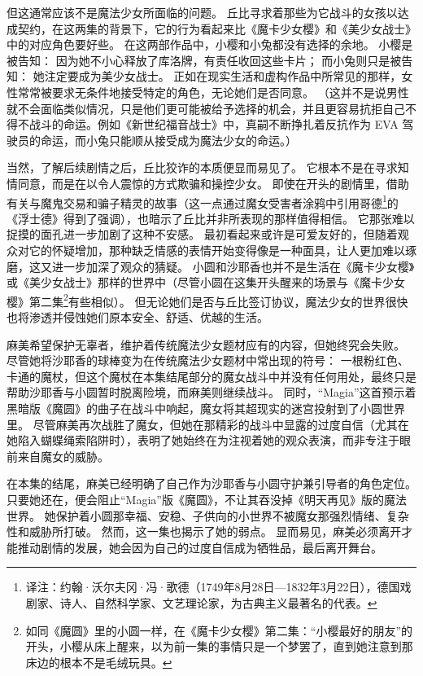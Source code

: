 但这通常应该不是魔法少女所面临的问题。
丘比寻求着那些为它战斗的女孩以达成契约，在这两集的背景下，它的行为看起来比《魔卡少女樱》和《美少女战士》中的对应角色要好些。
在这两部作品中，小樱和小兔都没有选择的余地。
小樱是被告知：
因为她不小心释放了库洛牌，有责任收回这些卡片\cite{ref11}；
而小兔则只是被告知：
她注定要成为美少女战士。
正如在现实生活和虚构作品中所常见的那样，女性常常被要求无条件地接受特定的角色，无论她们是否同意\cite{ref22}。
（这并不是说男性就不会面临类似情况，只是他们更可能被给予选择的机会，并且更容易抗拒自己不得不战斗的命运。例如《新世纪福音战士》中，真嗣不断挣扎着反抗作为 EVA 驾驶员的命运，而小兔只能顺从接受成为魔法少女的命运。）

当然，了解后续剧情之后，丘比狡诈的本质便显而易见了。
它根本不是在寻求知情同意，而是在以令人震惊的方式欺骗和操控少女。
即使在开头的剧情里，借助有关与魔鬼交易和骗子精灵的故事（这一点通过魔女受害者涂鸦中引用哥德\footnote{%
    译注：约翰·沃尔夫冈·冯·歌德（1749年8月28日—1832年3月22日），德国戏剧家、诗人、自然科学家、文艺理论家，为古典主义最著名的代表。
}的《浮士德》得到了强调），也暗示了丘比并非所表现的那样值得相信。
它那张难以捉摸的面孔进一步加剧了这种不安感。
最初看起来或许是可爱友好的，但随着观众对它的怀疑增加，那种缺乏情感的表情开始变得像是一种面具，让人更加难以琢磨，这又进一步加深了观众的猜疑。
小圆和沙耶香也并不是生活在《魔卡少女樱》或《美少女战士》那样的世界中（尽管小圆在这集开头醒来的场景与《魔卡少女樱》第二集\footnote{%
    如同《魔圆》里的小圆一样，在《魔卡少女樱》第二集：“小樱最好的朋友”的开头，小樱从床上醒来，以为前一集的事情只是一个梦罢了，直到她注意到那床边的根本不是毛绒玩具。
}\cite{ref24}有些相似）。
但无论她们是否与丘比签订协议，魔法少女的世界很快也将渗透并侵蚀她们原本安全、舒适、优越的生活。

麻美希望保护无辜者，维护着传统魔法少女题材应有的内容，但她终究会失败。
尽管她将沙耶香的球棒变为在传统魔法少女题材中常出现的符号：
一根粉红色、卡通的魔杖，但这个魔杖在本集结尾部分的魔女战斗中并没有任何用处，最终只是帮助沙耶香与小圆暂时脱离险境，而麻美则继续战斗。
同时，“Magia”这首预示着黑暗版《魔圆》的曲子在战斗中响起，魔女将其超现实的迷宫投射到了小圆世界里。
尽管麻美再次战胜了魔女，但她在那精彩的战斗中显露的过度自信（尤其在她陷入蝴蝶绳索陷阱时），表明了她始终在为注视着她的观众表演，而非专注于眼前来自魔女的威胁。

在本集的结尾，麻美已经明确了自己作为沙耶香与小圆守护兼引导者的角色定位。
只要她还在，便会阻止“Magia”版《魔圆》，不让其吞没掉《明天再见》版的魔法世界。
她保护着小圆那幸福、安稳、子供向的小世界不被魔女那强烈情绪、复杂性和威胁所打破。
然而，这一集也揭示了她的弱点。
显而易见，麻美必须离开才能推动剧情的发展，她会因为自己的过度自信成为牺牲品，最后离开舞台。
